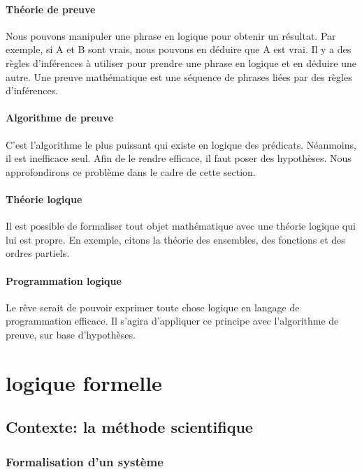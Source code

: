\subsection*{Théorie de preuve}

Nous pouvons manipuler une phrase en logique pour obtenir un résultat. Par exemple, si A et B sont vrais, nous pouvons en déduire que A est vrai. Il y a des règles d'inférences à utiliser pour prendre une phrase en logique et en déduire une autre.
Une preuve mathématique est une séquence de phrases liées par des règles d'inférences.

\subsection*{Algorithme de preuve}
C'est l'algorithme le plus puissant qui existe en logique des prédicats. Néanmoins, il est inefficace seul. Afin de le rendre efficace, il faut poser des hypothèses. Nous approfondirons ce problème dans le cadre de cette section. 

\subsection*{Théorie logique}

Il est possible de formaliser tout objet mathématique avec une théorie logique qui lui est propre.  En exemple, citons la théorie des ensembles, des fonctions et des ordres partiels.

\subsection*{Programmation logique}

Le rêve serait de pouvoir exprimer toute chose logique en langage de programmation efficace. Il s'agira d'appliquer ce principe avec l'algorithme de preuve, sur base d'hypothèses.

\part{logique formelle}
\chapter{Contexte: la méthode scientifique}

\section{Formalisation d'un système}

